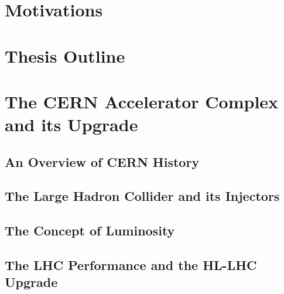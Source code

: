 
\section{Motivations}

\section{Thesis Outline}

\section{The CERN Accelerator Complex and its Upgrade}

\subsection{An Overview of CERN History}

\subsection{The Large Hadron Collider and its Injectors}

\subsection{The Concept of Luminosity}

\subsection{The LHC Performance and the HL-LHC Upgrade}
